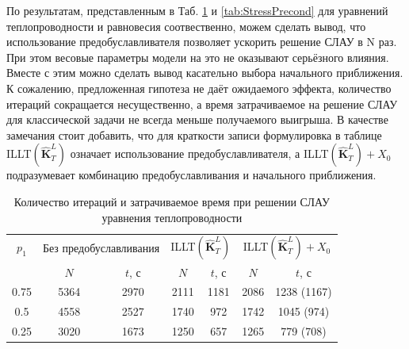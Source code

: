 По результатам, представленным в Таб. \ref{tab:ThermalPrecond} и \ref{tab:StressPrecond} для уравнений теплопроводности и равновесия соотвественно, можем сделать вывод, что использование предобуславливателя позволяет ускорить решение СЛАУ в N раз. При этом весовые параметры модели на это не оказывают серьёзного влияния. Вместе с этим можно сделать вывод касательно выбора начального приближения. К сожалению, предложенная гипотеза не даёт ожидаемого эффекта, количество итераций сокращается несущественно, а время затрачиваемое на решение СЛАУ для классической задачи не всегда меньше получаемого выигрыша. В качестве замечания стоит добавить, что для краткости записи формулировка в таблице ILLT$\left( \widehat{\textbf{K}}^L_T \right)$ означает использование предобуславливателя, а ILLT$\left( \widehat{\textbf{K}}^L_T \right) + X_0$ подразумевает комбинацию предобуславливания и начального приближения.

\begin{table}[htbp]
    \centering
    \begin{threeparttable}%
        \caption{Количество итераций и затрачиваемое время при решении СЛАУ уравнения теплопроводности}\label{tab:ThermalPrecond}
        \begin{tabular}{|c|c|c|c|c|c|c|}
		\hline
		$p_1$ & \multicolumn{2}{c|}{Без предобуславливания} & \multicolumn{2}{c|}{ILLT$\left( \widehat{\textbf{K}}^L_T \right)$} & \multicolumn{2}{c|}{ILLT$\left( \widehat{\textbf{K}}^L_T \right) + X_0$}\\
		\cline{2-7}
		     & $N$ & $t$, с & $N$ & $t$, с & $N$ & $t$, с \\
		\hline
		0.75 & 5364 & 2970 & 2111 & 1181 & 2086 & 1238 (1167) \\
		\hline
		0.5  & 4558 & 2527 & 1740 & 972 & 1742 & 1045 (974) \\
		\hline
		0.25 & 3020 & 1673 & 1250 & 657 & 1265 & 779 (708) \\
		\hline
        \end{tabular}
    \end{threeparttable}
\end{table}

